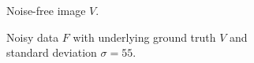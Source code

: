 \setlength{\fboxsep}{0pt}
\setlength{\fboxrule}{1pt}
\begin{figure}[H]
	\centering
	\begin{subfigure}[t]{0.48\linewidth}
		\centering
		\caption{Noise-free image $V$.}
		\label{fig: exampleV}
	\end{subfigure}
	\hfill
	\begin{subfigure}[t]{0.48\linewidth}
		\centering
		\caption{Noisy data $F$ with underlying ground truth $V$ and standard deviation $\sigma = 55$.}
		\label{fig: exampleF}
	\end{subfigure}
	\vfill
	\begin{subfigure}[t]{0.48\linewidth}
		\centering

\end{subfigure}
\end{figure}
